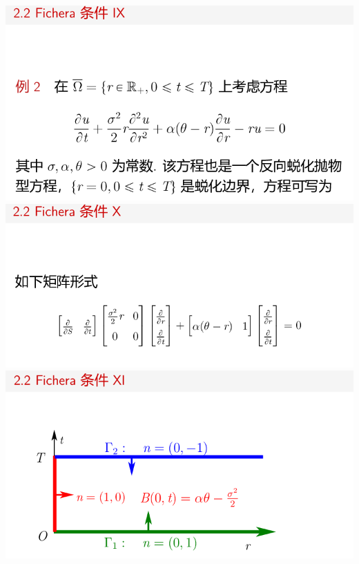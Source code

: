 \documentclass[11pt,a4paper]{ctexart}
\begin{document}
\begin{paracol}{2}
\includegraphics[width=\linewidth]{chap05_30.png}
\includegraphics[width=\linewidth]{chap05_31.png}
\includegraphics[width=\linewidth]{chap05_32.png}
\newpage


\end{paracol}
\end{document}
